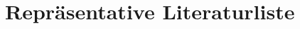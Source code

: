 \documentclass[10pt,a4paper]{article}
\begin{document}
\listoftodos



\pagestyle{headings}



\newpage


\newpage


\newpage
\tableofcontents

\newpage
\setcounter{page}{1}



\listoffigures
\lstlistoflistings
\listoftables

\newpage

\section{Repräsentative Literaturliste}
\nocite{*}
\printbibliography[title=~]

\setlength{\parskip}{10pt}
\end{document}
